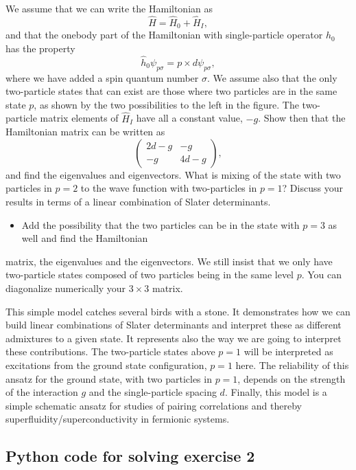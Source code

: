 \documentclass[%
twoside,                 %
final,                   %
10pt]{article}
\begin{document}
\noindent
We assume that we can write the Hamiltonian as
\[
       \hat{H}=\hat{H}_0+\hat{H}_I,
\]
and that the onebody part of the Hamiltonian with single-particle operator $\hat{h}_0$ has the property
\[
\hat{h}_0\psi_{p\sigma} = p\times d \psi_{p\sigma},
\]
where we have added a spin quantum number $\sigma$. 
We assume also that the only two-particle states that can exist are those where two particles are in the 
same state $p$, as shown by the two possibilities to the left in the figure.
The two-particle matrix elements of $\hat{H}_I$ have all a constant value, $-g$.
Show then that the Hamiltonian matrix can be written as 
\[
\left(\begin{array}{cc}2d-g &-g \\
-g &4d-g \end{array}\right),
\]
and find the eigenvalues and eigenvectors.  What is mixing of the state with two particles in $p=2$ 
to the wave function with two-particles in $p=1$? Discuss your results in terms of a linear combination
of Slater determinants. 
\begin{itemize}
\item Add the possibility that the two particles can be in the state with $p=3$ as well and find the Hamiltonian
\end{itemize}

\noindent
matrix, the eigenvalues and the eigenvectors. We still insist that we only have two-particle states composed of two particles being in the same
level $p$. You can diagonalize numerically your $3\times 3$ matrix.

This simple model catches several birds with a stone. It demonstrates how we can build linear combinations
of Slater determinants and interpret these as different admixtures to a given state. It represents also the way we are going to interpret these contributions.  The two-particle states above $p=1$ will be interpreted as 
excitations from the ground state configuration, $p=1$ here.  The reliability of this ansatz for the ground state, 
with two particles in $p=1$,
depends on the strength of the interaction $g$ and the single-particle spacing $d$.
Finally, this model is a simple schematic ansatz for studies of pairing correlations and thereby superfluidity/superconductivity  
in fermionic systems.



\subsection{Python code for solving exercise 2}
\end{document}
